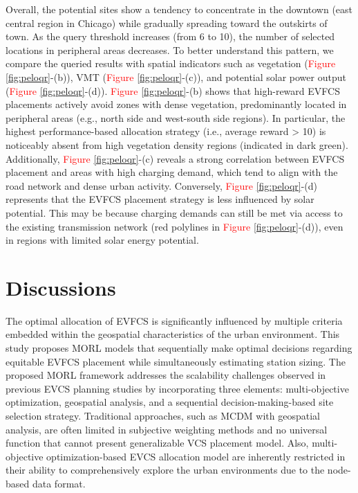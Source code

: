 \documentclass[preprint,12pt]{elsarticle}
\begin{document}
Overall, the potential sites show a tendency to concentrate in the downtown (east central region in Chicago) while gradually spreading toward the outskirts of town. As the query threshold increases (from 6 to 10), the number of selected locations in peripheral areas decreases. To better understand this pattern, we compare the queried results with spatial indicators such as vegetation (\textcolor{red}{Figure \ref{fig:peloqr}}-(b)), VMT (\textcolor{red}{Figure \ref{fig:peloqr}}-(c)), and potential solar power output (\textcolor{red}{Figure \ref{fig:peloqr}}-(d)). \textcolor{red}{Figure \ref{fig:peloqr}}-(b) shows that high-reward EVFCS placements actively avoid zones with dense vegetation, predominantly located in peripheral areas (e.g., north side and west-south side regions). In particular, the highest performance-based allocation strategy (i.e., average reward > 10) is noticeably absent from high vegetation density regions (indicated in dark green). Additionally, \textcolor{red}{Figure \ref{fig:peloqr}}-(c) reveals a strong correlation between EVFCS placement and areas with high charging demand, which tend to align with the road network and dense urban activity. Conversely, \textcolor{red}{Figure \ref{fig:peloqr}}-(d) represents that the EVFCS placement strategy is less influenced by solar potential. This may be because charging demands can still be met via access to the existing transmission network (red polylines in \textcolor{red}{Figure \ref{fig:peloqr}}-(d)), even in regions with limited solar energy potential. 

\section{Discussions}
The optimal allocation of EVFCS is significantly influenced by multiple criteria embedded within the geospatial characteristics of the urban environment. This study proposes MORL models that sequentially make optimal decisions regarding equitable EVFCS placement while simultaneously estimating station sizing. The proposed MORL framework addresses the scalability challenges observed in previous EVCS planning studies by incorporating three elements: multi-objective optimization, geospatial analysis, and a sequential decision-making-based site selection strategy. Traditional approaches, such as MCDM with geospatial analysis, are often limited in subjective weighting methods and no universal function that cannot present generalizable VCS placement model. Also, multi-objective optimization-based EVCS allocation model are inherently restricted in their ability to comprehensively explore the urban environments due to the node-based data format. 
\end{document}
